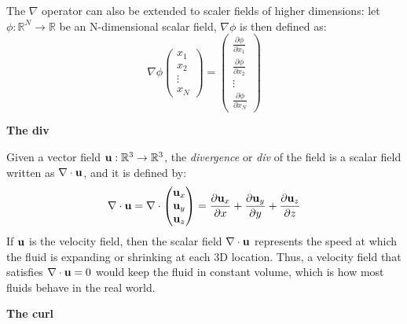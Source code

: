 The $\nabla$ operator can also be extended to scaler fields of higher dimensions: let $\phi : \mathbb{R} ^N \rightarrow \mathbb{R} $ be an N-dimensional scalar field, $\nabla \phi$ is then defined as:
\begin{equation*}
    \nabla \phi \begin{pmatrix}
        x_1 \\
        x_2 \\
        \vdots \\
        x_N
    \end{pmatrix}
    =
    \left(
    \begin{aligned}
        \frac{\partial \phi}{\partial x_1} \\
        \frac{\partial \phi}{\partial x_2} \\
        \vdots~~ \\
        \frac{\partial \phi}{\partial x_N}
    \end{aligned} \right)
\end{equation*} 

\gapM

\textbf{The div}

\gapS

Given a vector field $\textbf{u} : \mathbb{R} ^3 \rightarrow \mathbb{R} ^3$, the \textit{divergence} or \textit{div} of the field is a scalar field written as $\nabla \cdot \textbf{u}$, and it is defined by:
$$
    \nabla \cdot \textbf{u} 
    = \nabla \cdot 
    \begin{pmatrix}
        \textbf{u}_x \\
        \textbf{u}_y \\
        \textbf{u}_z
    \end{pmatrix}
    =
    \frac{\partial \textbf{u}_x}{\partial x} +  
    \frac{\partial \textbf{u}_y}{\partial y} +
    \frac{\partial \textbf{u}_z}{\partial z}
$$
If $\textbf{u}$ is the velocity field, then the scalar field $\nabla \cdot \textbf{u}$ represents the speed at which the fluid is expanding or shrinking at each 3D location. Thus, a velocity field that satisfies $\nabla \cdot \textbf{u} = 0$ would keep the fluid in constant volume, which is how most fluids behave in the real world.


\gapM

\textbf{The curl}

\gapS

